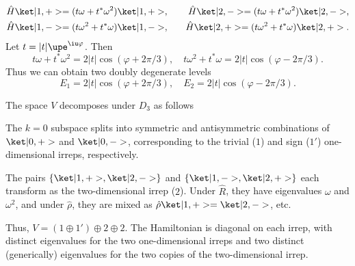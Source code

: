 \begin{solution}
\begin{enumext}
\begin{enumext}
      \begin{alignat*}{2}
          \hat H \ket|1, +> = (t \omega + t^* \omega^2) \ket|1, +>, & \quad
        & \hat H \ket|2, -> = (t \omega + t^* \omega^2) \ket|2, ->, \\
          \hat H \ket|1, -> = (t \omega^2 + t^* \omega) \ket|1, ->, &
        & \hat H \ket|2, +> = (t \omega^2 + t^* \omega) \ket|2, +>.
      \end{alignat*}
      Let $t = |t| \upe^{\iu\varphi}$. Then
      \[
        t \omega + t^* \omega^2 = 2|t| \cos(\varphi + 2\pi/3), \quad
        t \omega^2 + t^* \omega = 2|t| \cos(\varphi - 2\pi/3).
      \]
      Thus we can obtain two doubly degenerate levels
      \[
        E_1 = 2|t| \cos(\varphi + 2\pi/3), \quad
        E_2 = 2|t| \cos(\varphi - 2\pi/3).
      \]
    \end{enumext}
    The space $V$ decomposes under $D_3$ as follows
    \begin{enumext}
      \item The $k=0$ subspace splits into symmetric and antisymmetric
      combinations of $\ket|0, +>$ and $\ket|0, ->$, corresponding to the
      trivial ($1$) and sign ($1'$) one-dimensional irreps, respectively.
      \item The pairs $\{\ket|1, +>, \ket|2, ->\}$
      and $\{\ket|1, ->, \ket|2, +>\}$ each transform as the two-dimensional
      irrep ($2$). Under $\hat R$, they have eigenvalues $\omega$ and
      $\omega^2$, and under $\hat \rho$, they are mixed
      as $\hat \rho \ket|1, +> = \ket|2, ->$, etc.
    \end{enumext}
    Thus, $V = (1 \oplus 1') \oplus 2 \oplus 2$.
    The Hamiltonian is diagonal on each irrep, with distinct eigenvalues for
    the two one-dimensional irreps and two distinct (generically) eigenvalues
    for the two copies of the two-dimensional irrep.

    

\end{enumext}
\end{solution}
